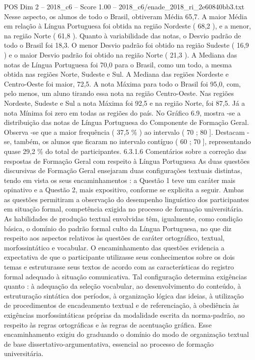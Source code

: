 \begin{textsample}{POS Dim 2 – 2018\_c6 – Score 1.00 – 2018\_c6/enade\_2018\_ri\_2e60840bb3.txt}
Nesse aspecto, os alunos de todo o Brasil, obtiveram Média 65,7.
A maior Média em relação à Língua Portuguesa foi obtida na região Nordeste ( 68,2 ), e a menor, na região Norte ( 61,8 ).
Quanto à variabilidade das notas, o Desvio padrão de todo o Brasil foi 18,3.
O menor Desvio padrão foi obtido na região Sudeste ( 16,9 ) e o maior Desvio padrão foi obtido na região Norte ( 21,3 ).
A Mediana das notas de Língua Portuguesa foi 70,0 para o Brasil, como um todo, a mesma obtida nas regiões Norte, Sudeste e Sul.
A Mediana das regiões Nordeste e Centro-Oeste foi maior, 72,5.
A nota Máxima para todo o Brasil foi 95,0, com, pelo menos, um aluno tirando essa nota na região Centro-Oeste.
Nas regiões Nordeste, Sudeste e Sul a nota Máxima foi 92,5 e na região Norte, foi 87,5.
Já a nota Mínima foi zero em todas as regiões do país.
No Gráfico 6.9, mostra -se a distribuição das notas de Língua Portuguesa do Componente de Formação Geral.
Observa -se que a maior frequência ( 37,5 \% ) ao intervalo ( 70 ; 80 ].
Destacam -se, também, os alunos que ficaram no intervalo contíguo ( 60 ; 70 ], representando quase 29,2 \% do total de participantes. 6.3.1.6 Comentários sobre a correção das respostas de Formação Geral com respeito à Língua Portuguesa As duas questões discursivas de Formação Geral ensejaram duas configurações textuais distintas, tendo em vista os seus encaminhamentos : a Questão 1 teve um caráter mais opinativo e a Questão 2, mais expositivo, conforme se explicita a seguir.
Ambas as questões permitiram a observação do desempenho linguístico dos participantes em situação formal, competência exigida no processo de formação universitária.
As habilidades de produção textual envolvidas têm, igualmente, como condição básica, o domínio do padrão formal culto da Língua Portuguesa, no que diz respeito aos aspectos relativos às questões de caráter ortográfico, textual, morfossintático e vocabular.
O encaminhamento das questões evidencia a expectativa de que o participante utilizasse seus conhecimentos sobre os dois temas e estruturasse seus textos de acordo com as características do registro formal adequado à situação comunicativa.
Tal configuração determina exigências quanto : à adequação da seleção vocabular, ao desenvolvimento do conteúdo, à estruturação sintática dos períodos, à organização lógica das ideias, à utilização de procedimentos de encadeamento textual e de referenciação, à obediência às exigências morfossintáticas próprias da modalidade escrita da norma-padrão, ao respeito às regras ortográficas e às regras de acentuação gráfica.
Esse encaminhamento exigiu do graduando o domínio do modo de organização textual de base dissertativo-argumentativa, essencial ao processo de formação universitária.

\end{textsample}
